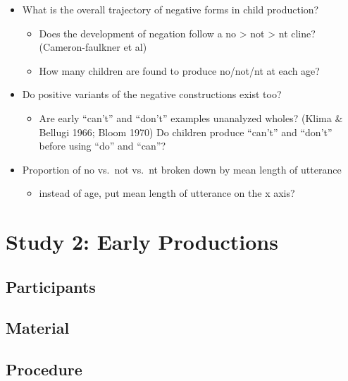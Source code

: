 \documentclass[man,floatsintext,draftall]{apa6}
\providecommand{\tightlist}{%
  \setlength{\itemsep}{0pt}\setlength{\parskip}{0pt}}
\begin{document}
\begin{itemize}
\tightlist
\item
  What is the overall trajectory of negative forms in child production?

  \begin{itemize}
  \tightlist
  \item
    Does the development of negation follow a no \textgreater{} not \textgreater{} nt cline? (Cameron-faulkner et al)
  \item
    How many children are found to produce no/not/nt at each age?
  \end{itemize}
\item
  Do positive variants of the negative constructions exist too?

  \begin{itemize}
  \tightlist
  \item
    Are early \enquote{can't} and \enquote{don't} examples unanalyzed wholes? (Klima \& Bellugi 1966; Bloom 1970) Do children produce \enquote{can't} and \enquote{don't} before using \enquote{do} and \enquote{can}?
  \end{itemize}
\item
  Proportion of no vs.~not vs.~nt broken down by mean length of utterance

  \begin{itemize}
  \tightlist
  \item
    instead of age, put mean length of utterance on the x axis?
  \end{itemize}
\end{itemize}

\hypertarget{study-2-early-productions}{%
\section{Study 2: Early Productions}\label{study-2-early-productions}}

\hypertarget{participants}{%
\subsection{Participants}\label{participants}}

\hypertarget{material}{%
\subsection{Material}\label{material}}

\hypertarget{procedure-1}{%
\subsection{Procedure}\label{procedure-1}}
\end{document}
